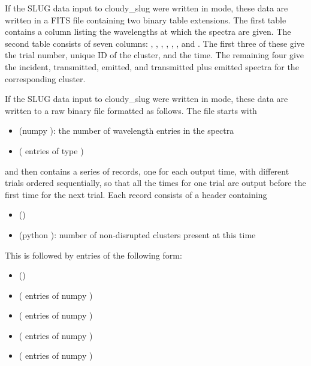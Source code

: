 \documentclass[letterpaper,10pt,english]{sphinxmanual}
\begin{document}
If the SLUG data input to cloudy\_slug were written in  mode,
these data are written in a FITS file containing two binary table
extensions. The first table contains a column  listing
the wavelengths at which the spectra are given. The second table
consists of seven columns: , , ,
, , ,
and . The first three of these
give the trial number, unique ID of the cluster, and the time. The
remaining four give the incident, transmitted, emitted, and
transmitted plus emitted spectra for the corresponding cluster.

If the SLUG data input to cloudy\_slug were written in  mode,
these data are written to a raw binary file formatted as follows. The
file starts with
\begin{itemize}
\item {} 
 (numpy ): the number of wavelength entries in the spectra

\item {} 
 ( entries of type )

\end{itemize}

and then contains a series of records, one for each output time, with
different trials ordered sequentially, so that all the times for one
trial are output before the first time for the next trial. Each record
consists of a header containing
\begin{itemize}
\item {} 
 ()

\item {} 
 (python ): number of non-disrupted clusters present at this time

\end{itemize}

This is followed by  entries of the following form:
\begin{itemize}
\item {} 
 ()

\item {} 
 ( entries of numpy )

\item {} 
 ( entries of numpy )

\item {} 
 ( entries of numpy )

\item {} 
 ( entries of numpy
)

\end{itemize}
\end{document}
